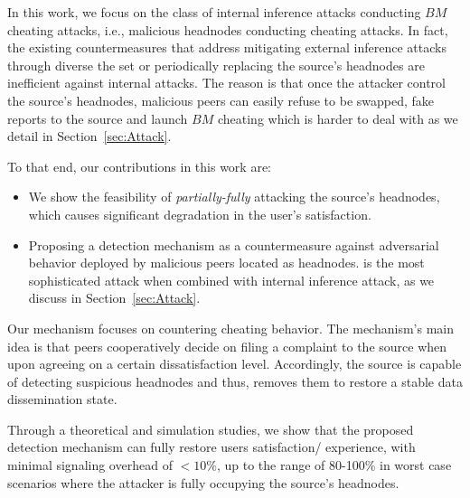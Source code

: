 In this work, we focus on the class of internal inference attacks conducting $BM$ cheating attacks, i.e., malicious headnodes conducting cheating attacks.
In fact, the existing countermeasures that address mitigating external inference attacks through diverse the set or periodically replacing the source's headnodes are inefficient against internal attacks.
The reason is that once the attacker control the source's headnodes, malicious peers can easily refuse to be swapped, fake reports to the source and launch $BM$ cheating which is harder to deal with as we detail in Section~\ref{sec:Attack}.

To that end, our contributions in this work are:
\begin{itemize}
 \item We show the feasibility of \textit{partially-fully} attacking the source's headnodes, which causes significant degradation in the user's satisfaction.
 \item Proposing a detection mechanism as a countermeasure against \drop adversarial behavior deployed by malicious peers located as headnodes. 
 \drop is the most sophisticated attack when combined with internal inference attack, as we discuss in Section~\ref{sec:Attack}.
\end{itemize}

Our mechanism focuses on countering \drop cheating behavior. 
The mechanism's main idea is that peers cooperatively decide on filing a complaint to the source when upon agreeing on a certain dissatisfaction level.
Accordingly, the source is capable of detecting suspicious headnodes and thus, removes them to restore a stable data dissemination state.

Through a theoretical and simulation studies, we show that the proposed detection mechanism can fully restore users satisfaction/ experience, with minimal signaling overhead of $<10\%$, up to the range of 80-100\% in worst case scenarios where the attacker is fully occupying the source's headnodes.

% 
